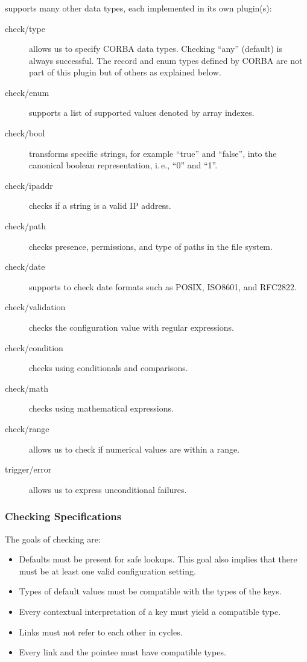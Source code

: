 \begin{frame}[allowframebreaks]
	\frametitle{}
	\elektra{} supports many other data types, each implemented in its own plugin(s):
	\begin{description}
	\item [check/type] allows us to specify CORBA data types.
	Checking ``any'' (default) is always successful.
	The record and enum types defined by CORBA are not part of this plugin but of others as explained below.

	\item [check/enum] supports a list of supported values denoted by array indexes.
	\item [check/bool] transforms specific strings, for example ``true'' and ``false'', into the canonical boolean representation, i.\,e., ``0'' and ``1''.
	\item [check/ipaddr] checks if a string is a valid IP address.
	\item [check/path] checks presence, permissions, and type of paths in the file system.
	\item [check/date] supports to check date formats such as POSIX, ISO8601, and RFC2822.
	\item [check/validation] checks the configuration value with regular expressions.
	\item [check/condition] checks using conditionals and comparisons.
	\item [check/math] checks using mathematical expressions.
	\item [check/range] allows us to check if numerical values are within a range.
	\item [trigger/error] allows us to express unconditional failures.
	\end{description}
\end{frame}

\begin{frame}
	\frametitle{Checking Specifications}

	The goals of checking  are:

	\begin{itemize}[<+-| alert@+>]
	\item Defaults must be present for safe lookups.
	This goal also implies that there must be at least one valid configuration setting.
	\item Types of default values must be compatible with the types of the keys.
	\item Every contextual interpretation of a key must yield a compatible type.
	\item Links must not refer to each other in cycles.
	\item Every link and the pointee must have compatible types.
	\end{itemize}
\end{frame}

